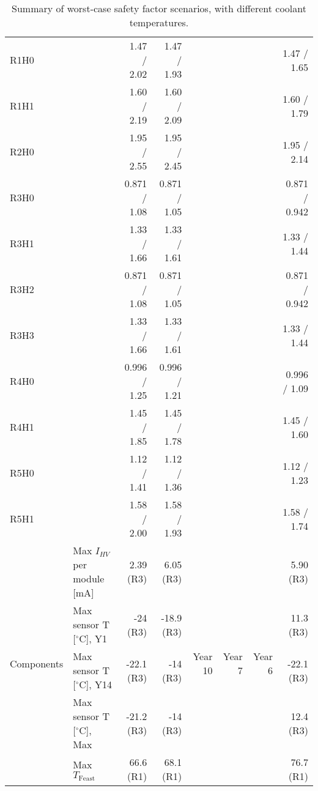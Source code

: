 \begin{table}[hb]
\begin{centering}
{\begin{tabular}{|l|l|r|r|r|r|r|r|}
R1H0                            &                                              &   1.47 / 2.02 &  1.47 / 1.93 &  & &  &   1.47 / 1.65 \\ 
R1H1                            &                                              &   1.60 / 2.19 &  1.60 / 2.09 &  & &  &   1.60 / 1.79 \\ 
R2H0                            &                                              &   1.95 / 2.55 &  1.95 / 2.45 &  & &  &   1.95 / 2.14 \\ 
R3H0                            &                                              &  0.871 / 1.08 & 0.871 / 1.05 &  & &  & 0.871 / 0.942 \\ 
R3H1                            &                                              &   1.33 / 1.66 &  1.33 / 1.61 &  & &  &   1.33 / 1.44 \\ 
R3H2                            &                                              &  0.871 / 1.08 & 0.871 / 1.05 &  & &  & 0.871 / 0.942 \\ 
R3H3                            &                                              &   1.33 / 1.66 &  1.33 / 1.61 &  & &  &   1.33 / 1.44 \\ 
R4H0                            &                                              &  0.996 / 1.25 & 0.996 / 1.21 &  & &  &  0.996 / 1.09 \\ 
R4H1                            &                                              &   1.45 / 1.85 &  1.45 / 1.78 &  & &  &   1.45 / 1.60 \\ 
R5H0                            &                                              &   1.12 / 1.41 &  1.12 / 1.36 &  & &  &   1.12 / 1.23 \\ 
R5H1                            &                                              &   1.58 / 2.00 &  1.58 / 1.93 &  & &  &   1.58 / 1.74 \\ \hline
\multirow{5}{*}{Components}     & Max $I_{HV}$ per module [mA]                 &     2.39 (R3) &    6.05 (R3) &\multirow{5}{*}{Year 10}&\multirow{5}{*}{Year  7}&\multirow{5}{*}{Year  6}&     5.90 (R3) \\ 
                                & Max sensor T [$^\circ$C], Y1                 &      -24 (R3) &   -18.9 (R3) &  & &  &     11.3 (R3) \\ 
                                & Max sensor T [$^\circ$C], Y14                &    -22.1 (R3) &     -14 (R3) &  & &  &    -22.1 (R3) \\ 
                                & Max sensor T [$^\circ$C], Max                &    -21.2 (R3) &     -14 (R3) &  & &  &     12.4 (R3) \\ 
                                & Max $T_\text{Feast}$                         &     66.6 (R1) &    68.1 (R1) &  & &  &     76.7 (R1) \\ 
\hline\end{tabular}
} %
\caption*{Summary of worst-case safety factor scenarios, with different coolant temperatures.}
\end{centering}
\end{table}
